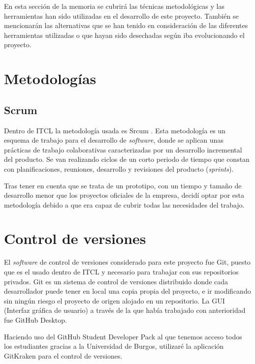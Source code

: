 
En esta sección de la memoria se cubrirá las técnicas metodológicas y las herramientas han sido utilizadas en el desarrollo de este proyecto. También se mencionarán las alternativas que se han tenido en consideración de las diferentes herramientas utilizadas o que hayan sido desechadas según iba evolucionando el proyecto.

\section{Metodologías}

\subsection{Scrum}

Dentro de ITCL la metodología usada es Srcum \cite{scrum:srum}. Esta metodología es un esquema de trabajo para el desarrollo de \textit{software}, donde se aplican unas prácticas de trabajo colaborativas caracterizadas por un desarrollo incremental del producto. Se van realizando ciclos de un corto periodo de tiempo que constan con planificaciones, reuniones, desarrollo y revisiones del producto (\textit{sprints}). 

Tras tener en cuenta que se trata de un prototipo, con un tiempo y tamaño de desarrollo menor que los proyectos oficiales de la empresa, decidí optar por esta metodología debido a que era capaz de cubrir todas las necesidades del trabajo.

\section{Control de versiones}

El \textit{software} de control de versiones \cite{wiki:control} considerado para este proyecto fue Git, puesto que es el usado dentro de ITCL y necesario para trabajar con sus repositorios privados. Git es un sistema de control de versiones distribuido donde cada desarrollador puede tener en local una copia propia del proyecto, e ir modificando sin ningún riesgo el proyecto de origen alojado en un repositorio. La GUI (Interfaz gráfica de usuario) a través de la que había trabajado con anterioridad fue GitHub Desktop. 

Haciendo uso del GitHub Student Developer Pack al que tenemos acceso todos los estudiantes gracias a la Universidad de Burgos, utilizaré la aplicación GitKraken para el control de versiones.

